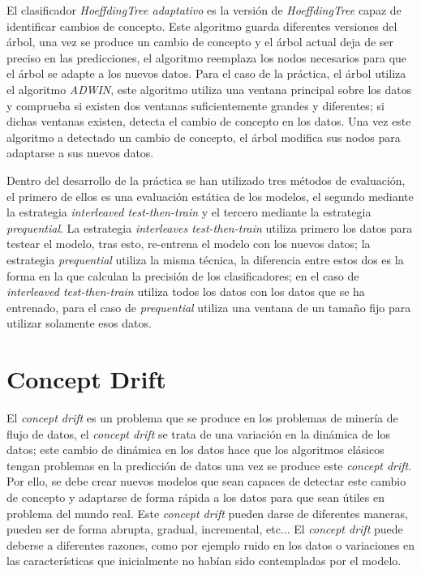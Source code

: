 El clasificador \textit{HoeffdingTree adaptativo} es la versión de \textit{HoeffdingTree} capaz de identificar cambios de concepto. Este algoritmo guarda diferentes versiones del árbol, una vez se produce un cambio de concepto y el árbol actual deja de ser preciso en las predicciones, el algoritmo reemplaza los nodos necesarios para que el árbol se adapte a los nuevos datos. Para el caso de la práctica, el árbol utiliza el algoritmo \textit{ADWIN}, este algoritmo utiliza una ventana principal sobre los datos y comprueba si existen dos ventanas suficientemente grandes y diferentes; si dichas ventanas existen, detecta el cambio de concepto en los datos. Una vez este algoritmo a detectado un cambio de concepto, el árbol modifica sus nodos para adaptarse a sus nuevos datos.

Dentro del desarrollo de la práctica se han utilizado tres métodos de evaluación, el primero de ellos es una evaluación estática de los modelos, el segundo mediante la estrategia \textit{interleaved test-then-train} y el tercero mediante la estrategia \textit{prequential}. La estrategia \textit{interleaves test-then-train}
utiliza primero los datos para testear el modelo, tras esto, re-entrena el modelo con los nuevos datos; la estrategia \textit{prequential} utiliza la misma técnica, la diferencia entre estos dos es la forma en la que calculan la precisión de los clasificadores; en el caso de \textit{interleaved test-then-train} utiliza todos los datos con los datos que se ha entrenado, para el caso de \textit{prequential} utiliza una ventana de un tamaño fijo para utilizar solamente esos datos.

\section{Concept Drift}
El \textit{concept drift} es un problema que se produce en los problemas de minería de flujo de datos, el \textit{concept drift} se trata de una variación en la dinámica de los datos; este cambio de dinámica en los datos hace que los algoritmos clásicos tengan problemas en la predicción de datos una vez se produce este \textit{concept drift}. Por ello, se debe crear nuevos modelos que sean capaces de detectar este cambio de concepto y adaptarse de forma rápida a los datos para que sean útiles en problema del mundo real. Este \textit{concept drift} pueden darse de diferentes maneras, pueden ser de forma abrupta, gradual, incremental, etc... El \textit{concept drift} puede deberse a diferentes razones, como por ejemplo ruido en los datos o variaciones en las características que inicialmente no habían sido contempladas por el modelo.

